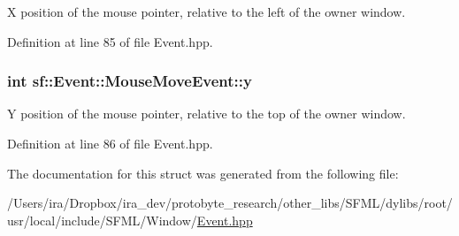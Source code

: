 X position of the mouse pointer, relative to the left of the owner window. 



Definition at line 85 of file Event.\-hpp.

\hypertarget{structsf_1_1_event_1_1_mouse_move_event_a86d78a2fba5b3abda16ca059f2392ad4}{
\subsubsection[{y}]{\setlength{\rightskip}{0pt plus 5cm}int sf\-::\-Event\-::\-Mouse\-Move\-Event\-::y}}\label{structsf_1_1_event_1_1_mouse_move_event_a86d78a2fba5b3abda16ca059f2392ad4}


Y position of the mouse pointer, relative to the top of the owner window. 



Definition at line 86 of file Event.\-hpp.



The documentation for this struct was generated from the following file\-:\begin{DoxyCompactItemize}
\item 
/\-Users/ira/\-Dropbox/ira\-\_\-dev/protobyte\-\_\-research/other\-\_\-libs/\-S\-F\-M\-L/dylibs/root/usr/local/include/\-S\-F\-M\-L/\-Window/\hyperlink{_event_8hpp}{Event.\-hpp}\end{DoxyCompactItemize}

